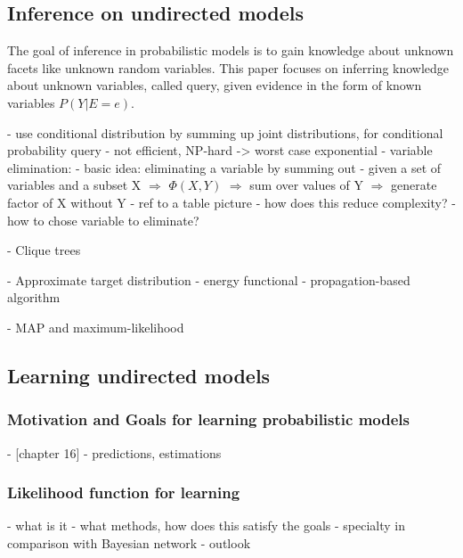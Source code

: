 \subsection{Inference on undirected models} \label{sec:infer}

The goal of inference in probabilistic models is to gain knowledge about unknown facets like unknown random variables. This paper focuses on inferring knowledge about unknown variables, called query, given evidence in the form of known variables $P(Y|E=e)$.

- use conditional distribution by summing up joint distributions, for conditional probability query
- not efficient, NP-hard -> worst case exponential
- variable elimination:
 - basic idea: eliminating a variable by summing out
 - given a set of variables and a subset X $\Rightarrow$ $\Phi(X,Y)$ $\Rightarrow$ sum over values of Y $\Rightarrow$ generate factor of X without Y
 - ref to a table picture %
 - how does this reduce complexity?
 - how to chose variable to eliminate?


- Clique trees %

- Approximate target distribution %
 - energy functional %
 - propagation-based algorithm %

- MAP and maximum-likelihood

\subsection{Learning undirected models}

\subsubsection{Motivation and Goals for learning probabilistic models}
- [chapter 16]
- predictions, estimations

\subsubsection{Likelihood function for learning}

- what is it
- what methods, how does this satisfy the goals
- specialty in comparison with Bayesian network
- outlook
